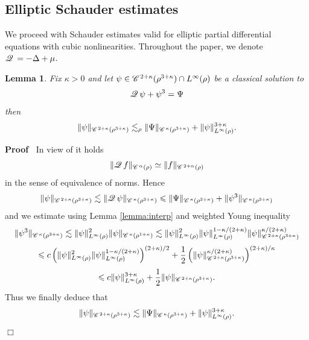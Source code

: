 \documentclass[a4paper,11pt]{article}
\renewcommand{\leq}{\leqslant}
\newenvironment{proof}{\noindent\textbf{Proof\ }}{\hspace*{\fill}$\Box$\medskip}
\newtheorem{lemma}[theorem]{Lemma}
\numberwithin{equation}{section}
\newcommand{\CC}{\mathscr{C} \hspace{.1em}}
\newcommand{\Q}{\mathscr{Q} \hspace{.2em}}
\newcommand{\8}{\infty}
\begin{document}
\subsection{Elliptic Schauder estimates}
\label{s:ell1}


We proceed with Schauder estimates valid for elliptic partial differential equations with cubic nonlinearities. Throughout the paper, we denote $\Q=-\Delta+\mu$.

\begin{lemma}
  \label{lemma:schauder-ellptic}Fix $\kappa > 0$ and let $\psi \in \CC^{2 +
  \kappa} (\rho^{3 + \kappa}) \cap L^{\infty} (\rho)$ be a classical solution
  to
  \[ \Q \psi + \psi^3 = \Psi \]
  then
  \[ \| \psi \|_{\CC^{2 + \kappa} (\rho^{3 + \kappa})} \lesssim_{\rho}  \|
     \Psi \|_{\CC^{\kappa} (\rho^{3 + \kappa})} + \| \psi \|_{L^{\infty}
     (\rho)}^{3 + \kappa}. \]
\end{lemma}



\begin{proof}
In view of \cite[Theorem 6.5]{T06} it holds
$$
\|\Q f\|_{\CC^\alpha(\rho)}\simeq \|f\|_{\CC^{2+\alpha}(\rho)}
$$
in the sense of equivalence of norms. Hence
$$
\|\psi\|_{\CC^{2+\kappa}(\rho^{3+\kappa})}\lesssim \|\Q\psi\|_{\CC^\kappa(\rho^{3+\kappa})}\leqslant \|\Psi\|_{\CC^\kappa(\rho^{3+\kappa})}+\|\psi^3\|_{\CC^\kappa(\rho^{3+\kappa})}
$$
and we estimate  using Lemma \ref{lemma:interp} and weighted Young inequality 
  \[ \| \psi^3 \|_{\CC^{\kappa} (\rho^{3 + \kappa})} \lesssim \| \psi
     \|_{L^{\infty} (\rho)}^2 \| \psi \|_{\CC^{\kappa} (\rho^{1 + \kappa})}\lesssim \| \psi
     \|_{L^{\infty} (\rho)}^2 \| \psi \|_{L^{\infty} (\rho)}^{1 - \kappa / (2
     + \kappa)} \| \psi \|_{\CC^{2 + \kappa} (\rho^{3 + \kappa})}^{\kappa / (2
     + \kappa)}
    \]
    \[
    \leq
    c\left( \|\psi\|_{L^{\infty} (\rho)}^2 \| \psi \|_{L^{\infty} (\rho)}^{1 - \kappa / (2
     + \kappa)}\right)^{(2 + \kappa) / 2} + \frac{1}{2}\left( \| \psi \|_{\CC^{2 +
     \kappa} (\rho^{3 + \kappa})}^{\kappa / (2 + \kappa)} \right)^{(2 +
     \kappa) / \kappa}
     \]
     \[
     \leqslant c\| \psi
     \|_{L^{\infty} (\rho)}^{3 + \kappa} +
     \frac{1}{2} \| \psi \|_{\CC^{2 + \kappa} (\rho^{3 + \kappa})} .
    \]
Thus we finally deduce that
\[ \| \psi \|_{\CC^{2 + \kappa} (\rho^{3 + \kappa})} \lesssim \| \Psi
     \|_{\CC^{\kappa} (\rho^{3 + \kappa})} + \| \psi \|_{L^{\infty} (\rho)}^{3
     + \kappa} . \]
\end{proof}
\end{document}
